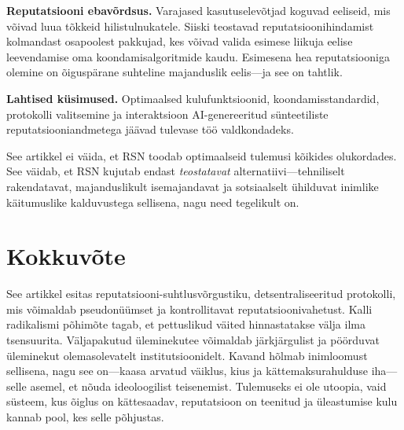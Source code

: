 \documentclass[11pt,a4paper,twocolumn]{article}
\begin{document}
\textbf{Reputatsiooni ebavõrdsus.} Varajased kasutuselevõtjad koguvad eeliseid, mis võivad luua tõkkeid hilistulnukatele. Siiski teostavad reputatsioonihindamist kolmandast osapoolest pakkujad, kes võivad valida esimese liikuja eelise leevendamise oma koondamisalgoritmide kaudu. Esimesena hea reputatsiooniga olemine on õiguspärane suhteline majanduslik eelis---ja see on tahtlik.

\textbf{Lahtised küsimused.} Optimaalsed kulufunktsioonid, koondamisstandardid, protokolli valitsemine ja interaktsioon AI-genereeritud sünteetiliste reputatsiooniandmetega jäävad tulevase töö valdkondadeks.

See artikkel ei väida, et RSN toodab optimaalseid tulemusi kõikides olukordades. See väidab, et RSN kujutab endast \emph{teostatavat} alternatiivi---tehniliselt rakendatavat, majanduslikult isemajandavat ja sotsiaalselt ühilduvat inimlike käitumuslike kalduvustega sellisena, nagu need tegelikult on.

\section{Kokkuvõte}

See artikkel esitas reputatsiooni-suhtlusvõrgustiku, detsentraliseeritud protokolli, mis võimaldab pseudonüümset ja kontrollitavat reputatsioonivahetust. Kalli radikalismi põhimõte tagab, et pettuslikud väited hinnastatakse välja ilma tsensuurita. Väljapakutud üleminekutee võimaldab järkjärgulist ja pöörduvat üleminekut olemasolevatelt institutsioonidelt. Kavand hõlmab inimloomust sellisena, nagu see on---kaasa arvatud väiklus, kius ja kättemaksurahulduse iha---selle asemel, et nõuda ideoloogilist teisenemist. Tulemuseks ei ole utoopia, vaid süsteem, kus õiglus on kättesaadav, reputatsioon on teenitud ja üleastumise kulu kannab pool, kes selle põhjustas.


\end{document}
